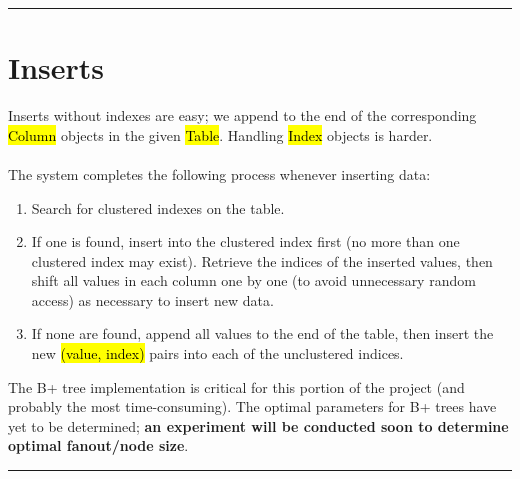 \documentclass[paper=letter, fontsize=11pt]{scrartcl}
\numberwithin{equation}{section}
\numberwithin{figure}{section}
\numberwithin{table}{section}
\newcommand{\horrule}[1]{\rule{\linewidth}{#1}}
\newcommand{\ttt}[1]{\hl{\ttfamily #1}}
\begin{document}
\horrule{0.5pt} 
\section{Inserts}
Inserts without indexes are easy; we append to the end of the corresponding \ttt{Column} objects in the given \ttt{Table}.  Handling \ttt{Index} objects is harder.
\\\\The system completes the following process whenever inserting data:
\begin{enumerate}
\item Search for clustered indexes on the table.
\item If one is found, insert into the clustered index first (no more than one clustered index may exist).  Retrieve the indices of the inserted values, then shift all values in each column one by one (to avoid unnecessary random access) as necessary to insert new data.
\item If none are found, append all values to the end of the table, then insert the new \ttt{(value, index)} pairs into each of the unclustered indices.
\end{enumerate}

The B+ tree implementation is critical for this portion of the project (and probably the most time-consuming).  The optimal parameters for B+ trees have yet to be determined; \textbf{an experiment will be conducted soon to determine optimal fanout/node size}.

\begin{center}
\end{center}

\horrule{0.5pt}
\end{document}
